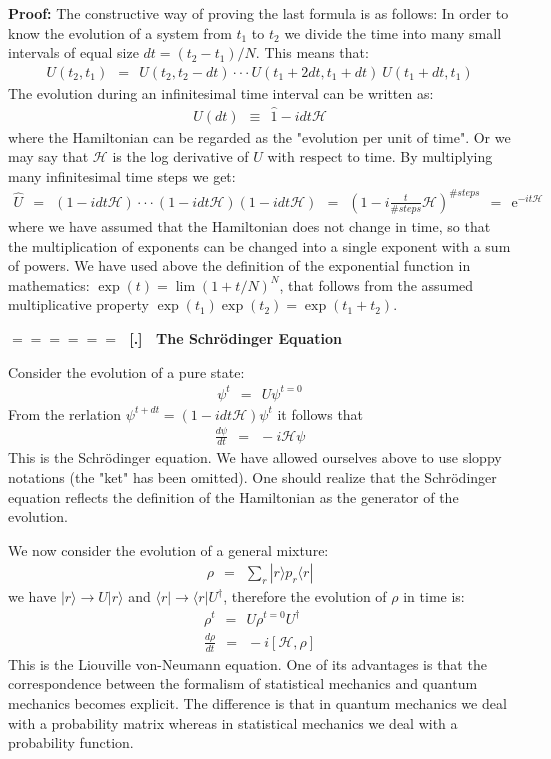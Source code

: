 \documentclass[onecolumn,fleqn]{revtex4}
\newcommand{\eexp}{\mathrm{e}^}
\newcommand{\beq}{\begin{eqnarray}}
\newcommand{\eeq}{\end{eqnarray}}
\renewcommand{\thesubsection}{\arabic{subsection}}
\renewcommand{\thesubsubsection}{\arabic{subsubsection}}
\newcommand{\sheadC}[1]
{
\addtocounter{subsubsection}{1}
\vspace{5mm}
{\Large\bf $=\!=\!=\!=\!=\!=\;$ [\thesubsection.\thesubsubsection] \ #1}  
\nopagebreak
\phantomsection
}
\begin{document}
 
{\bf Proof:} 
The constructive way of proving the last formula is as follows:
In order to know the evolution of a system from ${t_1}$ to ${t_2}$ 
we divide the time into many small intervals 
of equal size ${dt = (t_2-t_1)/N}$. This means that:
\beq
U(t_2,t_1) \ \ = \ \ U(t_2,t_2{-}dt) \cdot\cdot\cdot  U(t_1{+}2dt,t_1+dt) \ U(t_1{+}dt,t_1)
\eeq
The evolution during an infinitesimal time interval can be written as:
\beq
U(dt) \ \ \equiv \ \ \hat{1} - i dt \mathcal{H} 
\eeq
where the Hamiltonian can be regarded as the "evolution per unit of time". 
Or we may say that $\mathcal{H}$ is the log derivative of $U$ with respect 
to time. By multiplying many infinitesimal time steps we get:
\beq
\hat{U} \ \ =  \ \ (1-i dt\mathcal{H})\cdot \cdot \cdot (1-i dt\mathcal{H}) (1-idt\mathcal{H})
\ \ = \ \ 
\left(1-i \frac{t}{\#steps}\mathcal{H}\right)^{\#steps} 
\ \ = \ \ \eexp{-it\mathcal{H}} 
\eeq
where we have assumed that the Hamiltonian does not 
change in time, so that the multiplication of exponents 
can be changed into a single exponent with a sum of powers. 
We have used above the definition of the 
exponential function in mathematics: ${\exp(t) = \lim (1+t/N)^N}$, 
that follows from the assumed 
multiplicative property ${\exp(t_1)\exp(t_2)=\exp(t_1+t_2)}$. 


 
\sheadC{The Schr\"{o}dinger Equation}


Consider the evolution of a pure state:
\beq
\psi^{t} \ \ = \ \ U \psi^{t{=}0} 
\eeq
From the rerlation ${\psi^{t+dt} =(1-idt\mathcal{H})\psi^{t}}$ it follows that  
\beq 
\frac{d\psi}{dt} \ \ = \ \ -i\mathcal{H}\psi
\eeq
This is the Schr\"{o}dinger equation.
We have allowed ourselves above to use 
sloppy notations (the "ket" has been omitted). 
One should realize that the Schr\"{o}dinger equation
reflects the definition of the Hamiltonian 
as the generator of the evolution.
 
We now consider the evolution of a general mixture:
\beq
\rho \ \ = \ \ \sum_r |r\rangle p_r \langle r|
\eeq
we have $|r\rangle \rightarrow U|r\rangle$ and $\langle r| \rightarrow \langle r|U^\dagger$, 
therefore the evolution of $\rho$ in time is:
\beq
\rho^t \ \ = \ \ U \rho^{t{=}0}U^{\dagger} 
\\ 
\frac{d\rho}{dt} \ \ = \ \ -i[\mathcal{H}, \rho]
\eeq
This is the Liouville von-Neumann equation. 
One of its advantages is that the correspondence 
between the formalism of statistical mechanics  
and quantum mechanics becomes explicit. 
The difference is that in quantum mechanics we deal 
with a probability matrix whereas in statistical mechanics 
we deal with a probability function. 
\end{document}
